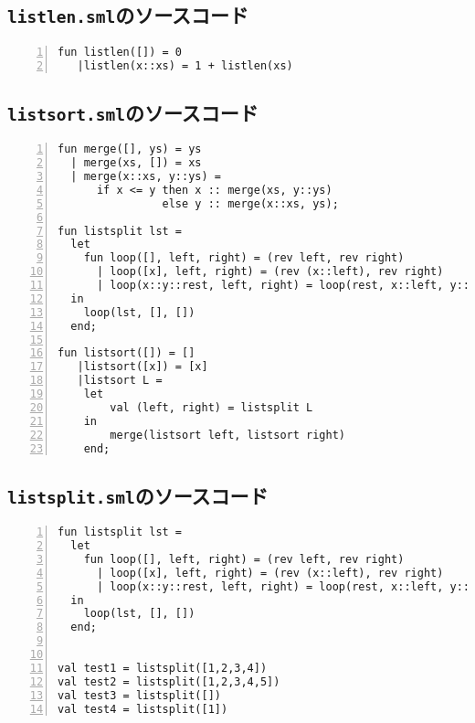 \documentclass[autodetect-engine,dvi=dvipdfmx,ja=standard,
               a4j,11pt]{bxjsarticle}
\begin{document}
\subsection{\texttt{listlen.sml}のソースコード} \label{listlen_code}
\begin{Verbatim}[numbers=left, xleftmargin=8mm, numbersep=6pt,
    fontsize=\small, baselinestretch=0.8]
fun listlen([]) = 0
   |listlen(x::xs) = 1 + listlen(xs)
\end{Verbatim}
\subsection{\texttt{listsort.sml}のソースコード} \label{listsort_code}
\begin{Verbatim}[numbers=left, xleftmargin=8mm, numbersep=6pt,
    fontsize=\small, baselinestretch=0.8]
fun merge([], ys) = ys
  | merge(xs, []) = xs
  | merge(x::xs, y::ys) =
      if x <= y then x :: merge(xs, y::ys)
                else y :: merge(x::xs, ys);

fun listsplit lst =
  let
    fun loop([], left, right) = (rev left, rev right)
      | loop([x], left, right) = (rev (x::left), rev right)
      | loop(x::y::rest, left, right) = loop(rest, x::left, y::right)
  in
    loop(lst, [], [])
  end;

fun listsort([]) = []
   |listsort([x]) = [x] 
   |listsort L = 
    let 
        val (left, right) = listsplit L
    in
        merge(listsort left, listsort right)
    end;
\end{Verbatim}
\subsection{\texttt{listsplit.sml}のソースコード} \label{listsplit_code}
\begin{Verbatim}[numbers=left, xleftmargin=8mm, numbersep=6pt,
    fontsize=\small, baselinestretch=0.8]
fun listsplit lst =
  let
    fun loop([], left, right) = (rev left, rev right)
      | loop([x], left, right) = (rev (x::left), rev right)
      | loop(x::y::rest, left, right) = loop(rest, x::left, y::right)
  in
    loop(lst, [], [])
  end;


val test1 = listsplit([1,2,3,4])
val test2 = listsplit([1,2,3,4,5])
val test3 = listsplit([])
val test4 = listsplit([1])
\end{Verbatim}
\end{document}

